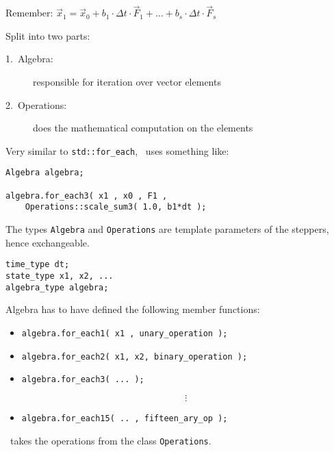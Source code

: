 \begin{frame}[fragile]

Remember: $\vec x_1 = \vec x_0 + b_1\cdot \Delta t \cdot \vec F_1 + \dots + b_s\cdot \Delta t \cdot \vec F_s$

\vspace{0.5em}

Split into two parts:

\begin{description}
 \item[1.~Algebra:] responsible for iteration over vector elements
 \item[2.~Operations:] does the mathematical computation on the elements
\end{description}

\vspace{0.5em}

Very similar to \lstinline+std::for_each+, \odeint\ uses something like:

\begin{lstlisting}
Algebra algebra;

algebra.for_each3( x1 , x0 , F1 ,
    Operations::scale_sum3( 1.0, b1*dt );
\end{lstlisting}
\pause

The types \lstinline+Algebra+ and \lstinline+Operations+ are template parameters of the steppers, hence exchangeable.
\end{frame}


\begin{frame}[fragile]

\begin{lstlisting}
time_type dt;
state_type x1, x2, ...
algebra_type algebra;
\end{lstlisting}

Algebra has to have defined the following member functions:

\begin{itemize}
 \item \lstinline+algebra.for_each1( x1 , unary_operation );+
 \item \lstinline+algebra.for_each2( x1, x2, binary_operation );+
 \item \lstinline+algebra.for_each3( ... );+

\[\vdots\]

 \item \lstinline+algebra.for_each15( .. , fifteen_ary_op );+
\end{itemize}

\pause
\odeint\ takes the operations from the class \lstinline+Operations+.

\end{frame}

